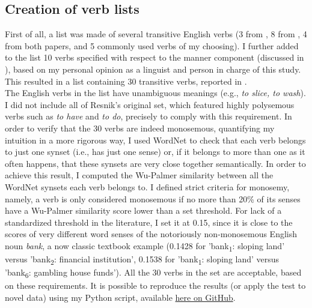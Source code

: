 \subsection{Creation of verb lists} 
First of all, a list was made of several transitive English verbs (3 from \textcite[138]{Resnik1993}, 8 from \textcite[33]{Levin1993}, 4 from both papers, and 5 commonly used verbs of my choosing). I further added to the list 10 verbs specified with respect to the manner component (discussed in ), based on my personal opinion as a linguist and person in charge of this study. This resulted in a list containing 30 transitive verbs, reported in .\\
The English verbs in the list have unambiguous meanings (e.g., \textit{to slice, to wash}). I did not include all of Resnik's original set, which featured highly polysemous verbs such as \textit{to have} and \textit{to do}, precisely to comply with this requirement. In order to verify that the 30 verbs are indeed monosemous, quantifying my intuition in a more rigorous way, I used WordNet \parencite{Miller1995} to check that each verb belongs to just one synset (i.e., has just one sense) or, if it belongs to more than one as it often happens, that these synsets are very close together semantically. In order to achieve this result, I computed the Wu-Palmer similarity between all the WordNet synsets each verb belongs to. I defined strict criteria for monosemy, namely, a verb is only considered monosemous if no more than 20\% of its senses have a Wu-Palmer similarity score lower than a set threshold. For lack of a standardized threshold in the literature, I set it at 0.15, since it is close to the scores of very different word senses of the notoriously non-monosemous English noun \textit{bank}, a now classic textbook example (0.1428 for 'bank\textsubscript{1}: sloping land' versus 'bank\textsubscript{2}: financial institution', 0.1538 for 'bank\textsubscript{1}: sloping land' versus 'bank\textsubscript{6}: gambling house funds'). All the 30 verbs in the set are acceptable, based on these requirements. It is possible to reproduce the results (or apply the test to novel data) using my Python script, available \href{https://github.com/giuliacappelli/checkPolysemy}{here on GitHub}.\\
